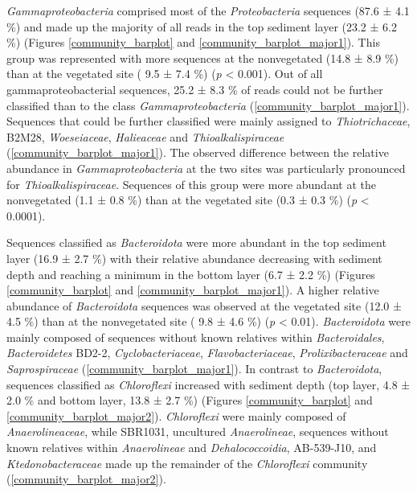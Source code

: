 \documentclass[12pt,]{article}
\begin{document}
\emph{Gammaproteobacteria} comprised most of the \emph{Proteobacteria}
sequences (87.6 ± 4.1 \si{\percent}) and made up the majority of all
reads in the top sediment layer (23.2 ± 6.2 \si{\percent}) (Figures
\ref{community_barplot} and \ref{community_barplot_major1}). This group
was represented with more sequences at the nonvegetated (14.8 ± 8.9
\si{\percent}) than at the vegetated site ( 9.5 ± 7.4 \si{\percent})
(\emph{p} \textless{} 0.001). Out of all gammaproteobacterial sequences,
25.2 ± 8.3 \si{\percent} of reads could not be further classified than
to the class \emph{Gammaproteobacteria}
(\autoref{community_barplot_major1}). Sequences that could be further
classified were mainly assigned to \emph{Thiotrichaceae}, B2M28,
\emph{Woeseiaceae}, \emph{Halieaceae} and \emph{Thioalkalispiraceae}
(\autoref{community_barplot_major1}). The observed difference between
the relative abundance in \emph{Gammaproteobacteria} at the two sites
was particularly pronounced for \emph{Thioalkalispiraceae}. Sequences of
this group were more abundant at the nonvegetated (1.1 ± 0.8
\si{\percent}) than at the vegetated site (0.3 ± 0.3 \si{\percent})
(\emph{p} \textless{} 0.0001).

Sequences classified as \emph{Bacteroidota} were more abundant in the
top sediment layer (16.9 ± 2.7 \si{\percent}) with their relative
abundance decreasing with sediment depth and reaching a minimum in the
bottom layer (6.7 ± 2.2 \si{\percent}) (Figures \ref{community_barplot}
and \ref{community_barplot_major1}). A higher relative abundance of
\emph{Bacteroidota} sequences was observed at the vegetated site (12.0 ±
4.5 \si{\percent}) than at the nonvegetated site ( 9.8 ± 4.6
\si{\percent}) (\emph{p} \textless{} 0.01). \emph{Bacteroidota} were
mainly composed of sequences without known relatives within
\emph{Bacteroidales}, \emph{Bacteroidetes} BD2-2,
\emph{Cyclobacteriaceae}, \emph{Flavobacteriaceae},
\emph{Prolixibacteraceae} and \emph{Saprospiraceae}
(\autoref{community_barplot_major1}). In contrast to
\emph{Bacteroidota}, sequences classified as \emph{Chloroflexi}
increased with sediment depth (top layer, 4.8 ± 2.0 \si{\percent} and
bottom layer, 13.8 ± 2.7 \si{\percent}) (Figures \ref{community_barplot}
and \ref{community_barplot_major2}). \emph{Chloroflexi} were mainly
composed of \emph{Anaerolineaceae}, while SBR1031, uncultured
\emph{Anaerolineae}, sequences without known relatives within
\emph{Anaerolineae} and \emph{Dehalococcoidia}, AB-539-J10, and
\emph{Ktedonobacteraceae} made up the remainder of the
\emph{Chloroflexi} community (\autoref{community_barplot_major2}).
\end{document}
